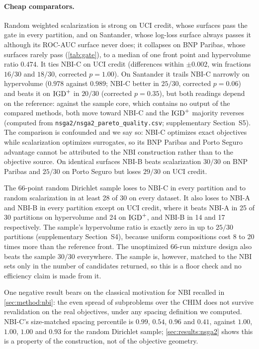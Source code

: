 \paragraph{Cheap comparators.} Random weighted scalarization is strong on UCI credit, whose surfaces pass the gate
in every partition, and on Santander, whose log-loss surface always passes it although its ROC-AUC surface never does;
it collapses on BNP Paribas, whose surfaces rarely pass (\cref{tab:gate}), to a median of one front point and
hypervolume ratio $0.474$. It ties NBI-C on UCI credit (differences within $\pm 0.002$, win fractions $16/30$ and
$18/30$, corrected $p = 1.00$). On Santander it trails NBI-C narrowly on hypervolume ($0.978$ against $0.989$; NBI-C
better in $25/30$, corrected $p = 0.06$) and beats it on $\mathrm{IGD}^{+}$ in $20/30$ (corrected $p = 0.35$), but both readings
depend on the reference: against the sample core, which contains no output of the compared methods, both move toward
NBI-C and the $\mathrm{IGD}^{+}$ majority reverses (computed from
\texttt{nsga2/\allowbreak nsga2\_\allowbreak pareto\_\allowbreak quality.csv}; supplementary Section~S5). The comparison is
confounded and we say so: NBI-C optimizes exact objectives while scalarization optimizes surrogates, so its BNP
Paribas and Porto Seguro advantage cannot be attributed to the NBI construction rather than to the objective source.
On identical surfaces NBI-B beats scalarization $30/30$ on BNP Paribas and $25/30$ on Porto Seguro but loses $29/30$
on UCI credit.

The 66-point random Dirichlet sample loses to NBI-C in every partition and to random scalarization in at least 28 of
30 on every dataset. It also loses to NBI-A and NBI-B in every partition except on UCI credit, where it beats NBI-A in
25 of 30 partitions on hypervolume and 24 on $\mathrm{IGD}^{+}$, and NBI-B in 14 and 17 respectively. The sample's hypervolume
ratio is exactly zero in up to $25/30$ partitions (supplementary Section~S4), because uniform compositions cost 8 to
20 times more than the reference front. The unoptimized 66-run mixture design also beats the sample $30/30$
everywhere. The sample is, however, matched to the NBI sets only in the number of candidates returned, so this is a
floor check and no efficiency claim is made from it.

One negative result bears on the classical motivation for NBI recalled in \cref{sec:method:nbi}: the even spread of
subproblems over the CHIM does not survive revalidation on the real objectives, under any spacing definition we
computed. NBI-C's size-matched spacing percentile is $0.99$, $0.54$, $0.96$ and $0.41$, against $1.00$, $1.00$, $1.00$
and $0.93$ for the random Dirichlet sample; \cref{sec:results:nsga2} shows this is a property of the construction, not
of the objective geometry.

